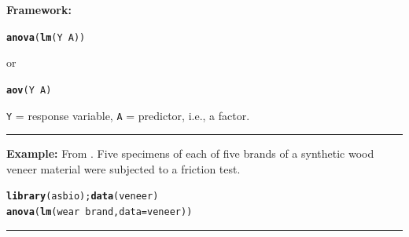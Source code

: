 \documentclass[12pt,english]{article}\usepackage[]{graphicx}\usepackage[table]{xcolor}
\makeatletter
\newcommand{\hlopt}[1]{\textcolor[rgb]{0,0,0}{#1}}%
\newcommand{\hldef}[1]{\textcolor[rgb]{0.345,0.345,0.345}{#1}}%
\newcommand{\hlkwc}[1]{\textcolor[rgb]{0.333,0.667,0.333}{#1}}%
\newcommand{\hlkwd}[1]{\textcolor[rgb]{0.737,0.353,0.396}{\textbf{#1}}}%
\newenvironment{kframe}{%
 \def\at@end@of@kframe{}%
 \ifinner\ifhmode%
  \def\at@end@of@kframe{\end{minipage}}%
  \begin{minipage}{\columnwidth}%
 \fi\fi%
 \def\FrameCommand##1{\hskip\@totalleftmargin \hskip-\fboxsep
 \colorbox{shadecolor}{##1}\hskip-\fboxsep
     \hskip-\linewidth \hskip-\@totalleftmargin \hskip\columnwidth}%
 \MakeFramed {\advance\hsize-\width
   \@totalleftmargin\z@ \linewidth\hsize
   \@setminipage}}%
 {\par\unskip\endMakeFramed%
 \at@end@of@kframe}
\newenvironment{knitrout}{}{} %
\makeatother
\begin{document}
\begin{tcolorbox}[colback=yellow!50!red!25!white,colbacktitle=yellow!50!red,colframe=black!75!white,title=\textbf{R:} One Way ANOVA - Fixed Effects]

\textbf{Framework:}\\
\vspace{-.2in}
\begin{knitrout}
\color{fgcolor}\begin{kframe}
\begin{alltt}
\hlkwd{anova}\hldef{(}\hlkwd{lm}\hldef{(Y} \hlopt{~} \hldef{A))}
\end{alltt}
\end{kframe}
\end{knitrout}
\vspace{-.1in}
or
\vspace{-.1in}
\begin{knitrout}
\color{fgcolor}\begin{kframe}
\begin{alltt}
\hlkwd{aov}\hldef{(Y} \hlopt{~} \hldef{A)}
\end{alltt}
\end{kframe}
\end{knitrout}
\texttt{Y} = response variable, \texttt{A} = predictor, i.e., a factor.
\vspace{0.1in}
\par\noindent\rule{.9\textwidth}{0.4pt}

\textbf{Example:} From \citep[][pg 52]{litt2002}.  Five specimens of each of five brands of a synthetic wood veneer material were subjected to a friction test.
\vspace{-.1in}
\begin{knitrout}
\color{fgcolor}\begin{kframe}
\begin{alltt}
\hlkwd{library}\hldef{(asbio);} \hlkwd{data}\hldef{(veneer)}
\hlkwd{anova}\hldef{(}\hlkwd{lm}\hldef{(wear} \hlopt{~} \hldef{brand,} \hlkwc{data} \hldef{= veneer))}
\end{alltt}
\end{kframe}
\end{knitrout}
\end{tcolorbox}
\par\noindent\rule{.9\textwidth}{0.4pt}
\end{document}
